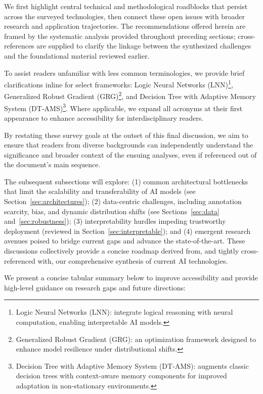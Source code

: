 \documentclass[sigconf]{acmart}
\begin{document}
We first highlight central technical and methodological roadblocks that persist across the surveyed technologies, then connect these open issues with broader research and application trajectories. The recommendations offered herein are framed by the systematic analysis provided throughout preceding sections; cross-references are supplied to clarify the linkage between the synthesized challenges and the foundational material reviewed earlier.

To assist readers unfamiliar with less common terminologies, we provide brief clarifications inline for select frameworks: Logic Neural Networks (LNN)\footnote{Logic Neural Networks (LNN): integrate logical reasoning with neural computation, enabling interpretable AI models.}, Generalized Robust Gradient (GRG)\footnote{Generalized Robust Gradient (GRG): an optimization framework designed to enhance model resilience under distributional shifts.}, and Decision Tree with Adaptive Memory System (DT-AMS)\footnote{Decision Tree with Adaptive Memory System (DT-AMS): augments classic decision trees with context-aware memory components for improved adaptation in non-stationary environments.}. Where applicable, we expand all acronyms at their first appearance to enhance accessibility for interdisciplinary readers.

By restating these survey goals at the outset of this final discussion, we aim to ensure that readers from diverse backgrounds can independently understand the significance and broader context of the ensuing analyses, even if referenced out of the document's main sequence.

The subsequent subsections will explore: (1) common architectural bottlenecks that limit the scalability and transferability of AI models (see Section~\ref{sec:architectures}); (2) data-centric challenges, including annotation scarcity, bias, and dynamic distribution shifts (see Sections~\ref{sec:data} and~\ref{sec:robustness}); (3) interpretability hurdles impeding trustworthy deployment (reviewed in Section~\ref{sec:interpretable}); and (4) emergent research avenues poised to bridge current gaps and advance the state-of-the-art. These discussions collectively provide a concise roadmap derived from, and tightly cross-referenced with, our comprehensive synthesis of current AI technologies.

We present a concise tabular summary below to improve accessibility and provide high-level guidance on research gaps and future directions:
\end{document}
